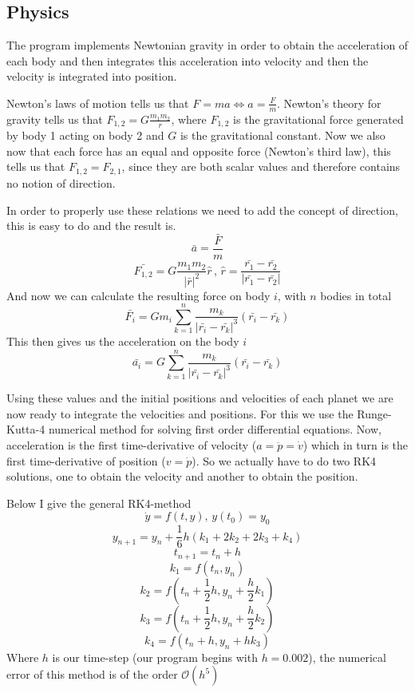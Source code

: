 \documentclass[a4paper,12pt]{article} \usepackage{graphicx}
\begin{document}
\subsection{Physics}
The program implements Newtonian gravity in order to obtain the acceleration of
each body and then integrates this acceleration into velocity and then the
velocity is integrated into position.

Newton's laws of motion tells us that $F=ma \Leftrightarrow a = \frac{F}{m}$.
Newton's theory for gravity tells us that $F_{1,2} = G\frac{m_1m_2}{r}$, where
$F_{1,2}$ is the gravitational force generated by body 1 acting on body 2 and
$G$ is the gravitational constant. Now we also now that each force has an equal
and opposite force (Newton's third law), this tells us that $F_{1,2} =
F_{2,1}$, since they are both scalar values and therefore contains no notion of
direction.

In order to properly use these relations we need to add the concept of
direction, this is easy to do and the result is.
\[
\bar{a} = \frac{\bar{F}}{m}
\]
\[
\bar{F_{1,2}} = G\frac{m_1m_2}{|\bar{r}|^2}\hat{r} \, , \, \hat{r} = \frac{\bar{r_1} - \bar{r_2}}{|\bar{r_1} - \bar{r_2}|}
\]
And now we can calculate the resulting force on body $i$, with $n$ bodies in total
\[
\bar{F_i} = G m_i\sum_{k=1}^n \frac{m_k}{|\bar{r_i} - \bar{r_k}|^3}\left( \bar{r_i} - \bar{r_k} \right)
\]
This then gives us the acceleration on the body $i$
\[
\bar{a_i} = G \sum_{k=1}^n \frac{m_k}{|\bar{r_i} - \bar{r_k}|^3}\left( \bar{r_i} - \bar{r_k} \right)
\]

Using these values and the initial positions and velocities of each planet we
are now ready to integrate the velocities and positions. For this we use the
Runge-Kutta-4 numerical method for solving first order differential equations.
Now, acceleration is the first time-derivative of velocity ($a=\ddot{p} =
\dot{v}$) which in turn is the first time-derivative of position ($v=\dot{p}$).
So we actually have to do two RK4 solutions, one to obtain the velocity and
another to obtain the position.

Below I give the general RK4-method
\[
\dot{y}=f(t,y),\,y(t_0)=y_0
\]
\[
y_{n+1} = y_n + \frac{1}{6}h\left( k_1 + 2k_2 + 2k_3 + k_4\right)
\]
\[
t_{n+1} = t_n +h
\]
\[
k_1 = f(t_n,y_n)
\]
\[
k_2 = f(t_n + \frac{1}{2}h,y_n + \frac{h}{2}k_1)
\]
\[
k_3 = f(t_n + \frac{1}{2}h,y_n + \frac{h}{2}k_2)
\]
\[
k_4 = f(t_n + h,y_n + hk_3)
\]
Where $h$ is our time-step (our program begins with $h = 0.002$), the numerical
error of this method is of the order $\mathcal{O}(h^5)$
\end{document}
